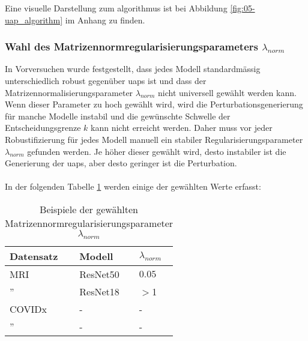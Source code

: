 Eine visuelle Darstellung zum \Gls{algorithmus} ist bei Abbildung \ref{fig:05-uap_algorithm} im Anhang zu finden. 

\subsubsection{Wahl des Matrizennormregularisierungsparameters $\lambda_{norm}$}

In Vorversuchen wurde festgestellt, dass jedes Modell standardmässig unterschiedlich robust gegenüber \acrshort{uap}s ist und dass der Matrizennormalisierungsparameter $\lambda_{norm}$ nicht universell gewählt werden kann. Wenn dieser Parameter zu hoch gewählt wird, wird die Perturbationsgenerierung für manche Modelle instabil und die gewünschte Schwelle der Entscheidungsgrenze $k$ kann nicht erreicht werden. Daher muss vor jeder Robustifizierung für jedes Modell manuell ein stabiler Regularisierungsparameter $\lambda_{norm}$ gefunden werden. Je höher dieser gewählt wird, desto instabiler ist die Generierung der \acrshort{uap}s, aber desto geringer ist die Perturbation.
\\
\\
In der folgenden Tabelle \ref{tab:Matrizennormregularisierungsparameter} werden einige der gewählten Werte erfasst:

\begin{table}[h!]
\centering
\begin{tabular}{l|l|l}
\hline
\textbf{Datensatz} & \textbf{Modell} & \textbf{$\lambda_{norm}$} \\ 
\hline
MRI & ResNet50 & $0.05$ \\
\hline
'' & ResNet18 & $>$1 \\
\hline
COVIDx & - & - \\
\hline
'' & - & - \\
\bottomrule
\end{tabular}
\caption{Beispiele der gewählten Matrizennormregularisierungsparameter $\lambda_{norm}$}
\label{tab:Matrizennormregularisierungsparameter}
\end{table}

